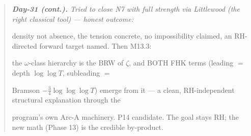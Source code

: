 \documentclass[10pt]{article}
\begin{document}
\begin{quote}\itshape
\textbf{Day-31 (cont.).} Tried to close N7 with full strength via Littlewood (the right classical tool) --- honest outcome:\par
density not absence, the tension concrete, no impossibility claimed, an RH-directed forward target named. Then M13.3:\par
the \ensuremath{\omega}-class hierarchy is the BRW of $\zeta$, and BOTH FHK terms (leading $=$ depth $\log\log T$, subleading $=$\par
Bramson $-\tfrac34\log\log\log T$) emerge from it --- a clean, RH-independent structural explanation through the\par
program's own Arc-A machinery. P14 candidate. The goal stays RH; the new math (Phase 13) is the credible by-product.\par
\end{quote}
\end{document}
